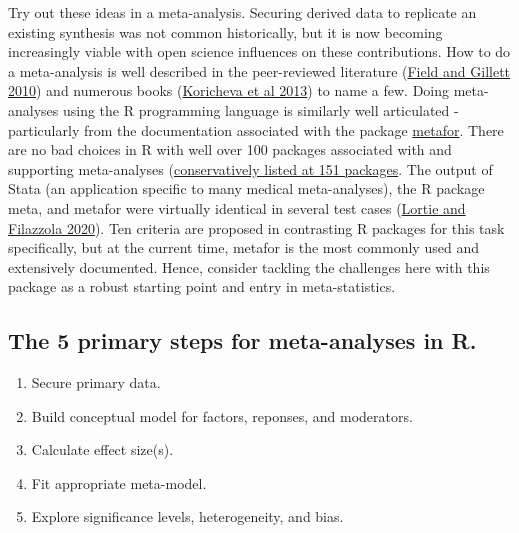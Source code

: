 \documentclass[
]{book}
\providecommand{\tightlist}{%
  \setlength{\itemsep}{0pt}\setlength{\parskip}{0pt}}
\begin{document}
Try out these ideas in a meta-analysis. Securing derived data to replicate an existing synthesis was not common historically, but it is now becoming increasingly viable with open science influences on these contributions. How to do a meta-analysis is well described in the peer-reviewed literature (\href{https://bpspsychub.onlinelibrary.wiley.com/doi/epdf/10.1348/000711010X502733}{Field and Gillett 2010}) and numerous books (\href{https://press.princeton.edu/books/hardcover/9780691137285/handbook-of-meta-analysis-in-ecology-and-evolution}{Koricheva et al 2013}) to name a few. Doing meta-analyses using the R programming language is similarly well articulated - particularly from the documentation associated with the package \href{https://www.metafor-project.org/doku.php}{metafor}. There are no bad choices in R with well over 100 packages associated with and supporting meta-analyses (\href{https://cran.r-project.org/web/views/MetaAnalysis.html}{conservatively listed at 151 packages}. The output of Stata (an application specific to many medical meta-analyses), the R package meta, and metafor were virtually identical in several test cases (\href{https://onlinelibrary.wiley.com/doi/full/10.1002/ece3.6747}{Lortie and Filazzola 2020}). Ten criteria are proposed in contrasting R packages for this task specifically, but at the current time, metafor is the most commonly used and extensively documented. Hence, consider tackling the challenges here with this package as a robust starting point and entry in meta-statistics.

\hypertarget{the-5-primary-steps-for-meta-analyses-in-r.}{%
\subsection*{The 5 primary steps for meta-analyses in R.}\label{the-5-primary-steps-for-meta-analyses-in-r.}}

\begin{enumerate}
\def\labelenumi{\arabic{enumi}.}
\tightlist
\item
  Secure primary data.\\
\item
  Build conceptual model for factors, reponses, and moderators.
\item
  Calculate effect size(s).\\
\item
  Fit appropriate meta-model.\\
\item
  Explore significance levels, heterogeneity, and bias.
\end{enumerate}
\end{document}
